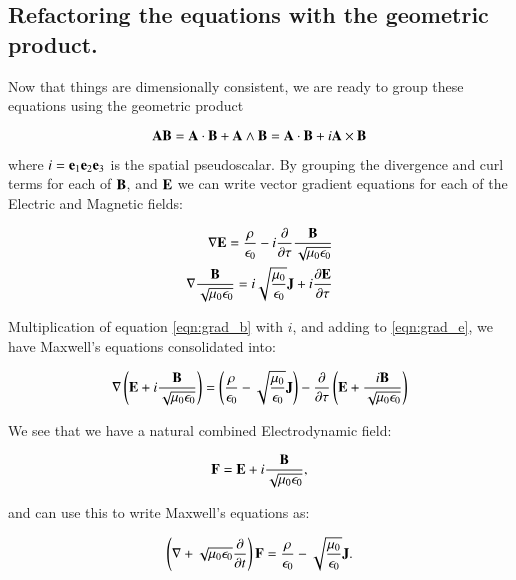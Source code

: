 \documentclass{article}      %
\newcommand{\grad}[0]{\nabla}
\begin{document}
\subsection{ Refactoring the equations with the geometric product. }

Now that things are dimensionally consistent, we are ready to group these equations using the geometric product

\begin{equation}
\mathbf{A} \mathbf{B} = \mathbf{A} \cdot \mathbf{B} + \mathbf{A} \wedge \mathbf{B} = \mathbf{A} \cdot \mathbf{B} + i \mathbf{A} \times \mathbf{B}
\end{equation}

where $i = \mathbf{e}_1\mathbf{e}_2\mathbf{e}_3$ is the spatial pseudoscalar.  By grouping the divergence and curl terms for each of $\mathbf{B}$, and $\mathbf{E}$ we can write vector gradient equations
for each of the Electric and Magnetic fields:

\begin{align}
\grad \BE = \frac{\rho}{\epsilon_0} - i \frac{\partial}{\partial \tau} \frac{\BB}{\sqrt{\mu_0\epsilon_0}} \label{eqn:grad_e} \\
\grad \frac{\BB}{\sqrt{\mu_0\epsilon_0}} = i\sqrt{\frac{\mu_0}{\epsilon_0}} \BJ + i\frac{\partial \BE}{\partial \tau} \label{eqn:grad_b}
\end{align}

Multiplication of equation \ref{eqn:grad_b} with $i$, and adding to \ref{eqn:grad_e}, we have Maxwell's equations consolidated into:

\begin{equation}
\grad \left(\BE + i \frac{\BB}{\sqrt{\mu_0\epsilon_0}}\right) =
\left(\frac{\rho}{\epsilon_0} - \sqrt{\frac{\mu_0}{\epsilon_0}} \BJ\right)
- \frac{\partial}{\partial \tau} \left(\BE + \frac{i\BB}{\sqrt{\mu_0\epsilon_0}} \right)
\end{equation}

We see that we have a natural combined Electrodynamic field:

\begin{equation}
\mathbf{F} = \mathbf{E} + i \frac{\mathbf{B}}{\sqrt{\mu_0\epsilon_0}},
\end{equation}

and can use this to write Maxwell's equations as:

\begin{equation}
\left(\grad + \sqrt{\mu_0\epsilon_0}\frac{\partial}{\partial t} \right) \BF = \frac{\rho}{\epsilon_0} - \sqrt{\frac{\mu_0}{\epsilon_0}} \BJ.  \label{eqn:maxwell}
\end{equation}
\end{document}
